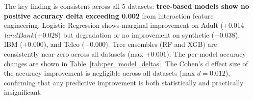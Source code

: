 \documentclass[conference]{IEEEtran}
\begin{document}
The key finding is consistent across all 5 datasets: \textbf{tree-based models show no positive accuracy delta exceeding 0.002} from interaction feature engineering. Logistic Regression shows marginal improvement on Adult ($+$0.014$) and Bank ($+$0.028$) but degradation or no improvement on synthetic ($-$0.038), IBM ($+$0.000), and Telco ($-$0.000). Tree ensembles (RF and XGB) are consistently near-zero across all datasets (max $+0.001$). The per-model accuracy changes are shown in Table~\ref{tab:per_model_deltas}. The Cohen's d effect size of the accuracy improvement is negligible across all datasets (max $d = 0.012$), confirming that any predictive improvement is both statistically and practically insignificant.

\begin{table}[htb]
\centering
\footnotesize
\renewcommand{\arraystretch}{1.15}
\caption{Per-model accuracy with and without interaction features across all datasets. LR shows marginal gains; RF and XGB show no improvement.}
\label{tab:per_model_deltas}
\end{table}
\end{document}
